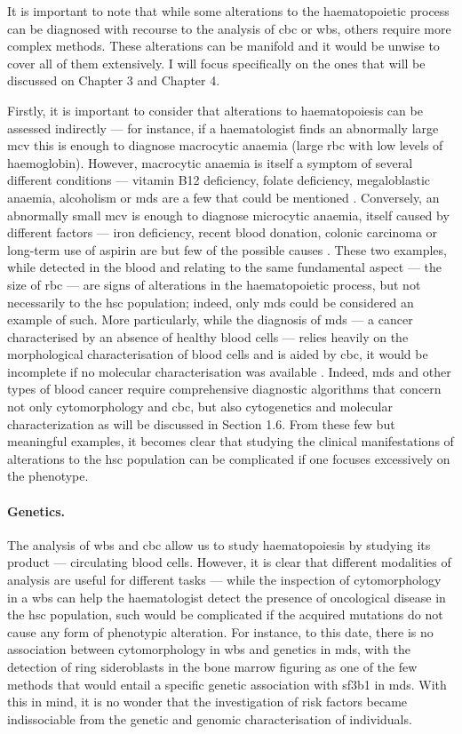 It is important to note that while some alterations to the haematopoietic process can be diagnosed with recourse to the analysis of \ac{cbc} or \ac{wbs}, others require more complex methods. These alterations can be manifold and it would be unwise to cover all of them extensively. I will focus specifically on the ones that will be discussed on Chapter 3 and Chapter 4. 

Firstly, it is important to consider that alterations to haematopoiesis can be assessed indirectly --- for instance, if a haematologist finds an abnormally large \ac{mcv} this is enough to diagnose macrocytic anaemia (large \ac{rbc} with low levels of haemoglobin). However, macrocytic anaemia is itself a symptom of several different conditions --- vitamin B12 deficiency, folate deficiency, megaloblastic anaemia, alcoholism or \ac{mds} are a few that could be mentioned \cite{Nagao2017-bx}. Conversely, an abnormally small \ac{mcv} is enough to diagnose microcytic anaemia, itself caused by different factors --- iron deficiency, recent blood donation, colonic carcinoma or long-term use of aspirin are but few of the possible causes \cite{Short2013-pz}. These two examples, while detected in the blood and relating to the same fundamental aspect --- the size of \ac{rbc} --- are signs of alterations in the haematopoietic process, but not necessarily to the \ac{hsc} population; indeed, only \ac{mds} could be considered an example of such. More particularly, while the diagnosis of \ac{mds} --- a cancer characterised by an absence of healthy blood cells --- relies heavily on the morphological characterisation of blood cells and is aided by \ac{cbc}, it would be incomplete if no molecular characterisation was available \cite{Invernizzi2015-ob}. Indeed, \ac{mds} and other types of blood cancer require comprehensive diagnostic algorithms that concern not only cytomorphology and \ac{cbc}, but also cytogenetics and molecular characterization as will be discussed in Section 1.6. From these few but meaningful examples, it becomes clear that studying the clinical manifestations of alterations to the \ac{hsc} population can be complicated if one focuses excessively on the phenotype.
\paragraph{Genetics.} The analysis of \ac{wbs} and \ac{cbc} allow us to study haematopoiesis by studying its product --- circulating blood cells. However, it is clear that different modalities of analysis are useful for different tasks --- while the inspection of cytomorphology in a \ac{wbs} can help the haematologist detect the presence of oncological disease in the \ac{hsc} population, such would be complicated if the acquired mutations do not cause any form of phenotypic alteration. For instance, to this date, there is no association between cytomorphology in \ac{wbs} and genetics in \ac{mds}, with the detection of ring sideroblasts in the bone marrow figuring as one of the few methods that would entail a specific genetic association with \ac{sf3b1} in \ac{mds}. With this in mind, it is no wonder that the investigation of risk factors became indissociable from the genetic and genomic characterisation of individuals.

